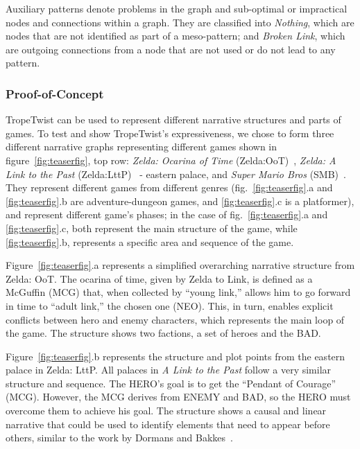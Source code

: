 Auxiliary patterns denote problems in the graph and sub-optimal or impractical nodes and connections within a graph. They are classified into \textit{Nothing}, which are nodes that are not identified as part of a meso-pattern; and \textit{Broken Link}, which are outgoing connections from a node that are not used or do not lead to any pattern.

\subsubsection{Proof-of-Concept}
\label{sec:PoC}

TropeTwist can be used to represent different narrative structures and parts of games. To test and show TropeTwist's expressiveness, we chose to form three different narrative graphs representing different games shown in figure~\ref{fig:teaserfig}, top row: \emph{Zelda: Ocarina of Time} (Zelda:OoT)~, \emph{Zelda: A Link to the Past} (Zelda:LttP)~ - eastern palace, and \emph{Super Mario Bros} (SMB)~. They represent different games from different genres (fig.~\ref{fig:teaserfig}.a and \ref{fig:teaserfig}.b are adventure-dungeon games, and \ref{fig:teaserfig}.c is a platformer), and represent different game's phases; in the case of fig.~\ref{fig:teaserfig}.a and \ref{fig:teaserfig}.c, both represent the main structure of the game, while \ref{fig:teaserfig}.b, represents a specific area and sequence of the game.

Figure~\ref{fig:teaserfig}.a represents a simplified overarching narrative structure from Zelda: OoT. The ocarina of time, given by Zelda to Link, is defined as a McGuffin (MCG) that, when collected by ``young link,'' allows him to go forward in time to ``adult link,'' the chosen one (NEO). This, in turn, enables explicit conflicts between hero and enemy characters, which represents the main loop of the game. The structure shows two factions, a set of heroes and the BAD. %


Figure~\ref{fig:teaserfig}.b represents the structure and plot points from the eastern palace in Zelda: LttP. All palaces in \textit{A Link to the Past} follow a very similar structure and sequence. The HERO's goal is to get the ``Pendant of Courage'' (MCG). However, the MCG derives from ENEMY and BAD, so the HERO must overcome them to achieve his goal. The structure shows a causal and linear narrative that could be used to identify elements that need to appear before others, similar to the work by Dormans and Bakkes~. %

